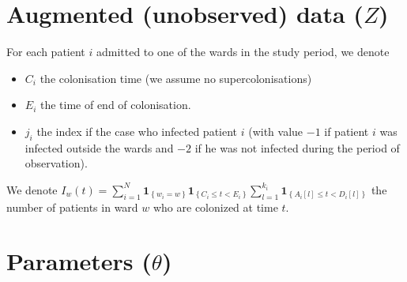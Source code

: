 \documentclass[10pt]{article}
\begin{document}
\section*{Augmented (unobserved) data ($Z$)}

For each patient $i$ admitted to one of the wards in the study period, we denote 
\begin{itemize}
	\item $C_i$ the colonisation time (we assume no supercolonisations)
	\item $E_i$ the time of end of colonisation.
	\item $j_i$ the index if the case who infected patient $i$ (with value $-1$ if patient $i$ was infected outside the wards and $-2$ if he was not infected during the period of observation). 
\end{itemize}


\noindent We denote $I_w\left(t\right)=\sum_{i=1}^{N} \mathbf{1}_{\left\lbrace w_i=w \right\rbrace} \mathbf{1}_{\left\lbrace C_i \leq t < E_i \right\rbrace} \sum_{l=1}^{k_i} \mathbf{1}_{\left\lbrace A_i[l] \leq t < D_i[l] \right\rbrace} $  the number of patients in ward $w$ who are colonized at time $t$.

\section*{Parameters ($\theta$)}
\end{document}
